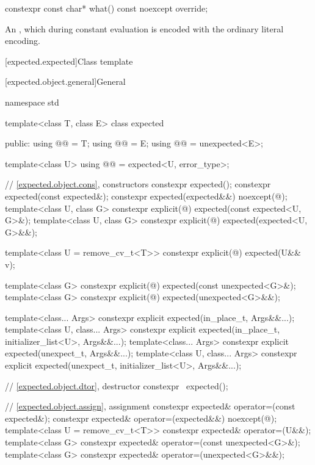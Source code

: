 %
\begin{itemdecl}
constexpr const char* what() const noexcept override;
\end{itemdecl}

\begin{itemdescr}
\pnum
\returns
An  \ntbs,
which during constant evaluation is encoded with
the ordinary literal encoding.
\end{itemdescr}

[expected.expected]{Class template }

[expected.object.general]{General}

\begin{codeblock}
namespace std {
  template<class T, class E>
  class expected {
  public:
    using @@ = T;
    using @@ = E;
    using @@ = unexpected<E>;

    template<class U>
    using @@ = expected<U, error_type>;

    // \ref{expected.object.cons}, constructors
    constexpr expected();
    constexpr expected(const expected&);
    constexpr expected(expected&&) noexcept(@\seebelow@);
    template<class U, class G>
      constexpr explicit(@\seebelow@) expected(const expected<U, G>&);
    template<class U, class G>
      constexpr explicit(@\seebelow@) expected(expected<U, G>&&);

    template<class U = remove_cv_t<T>>
      constexpr explicit(@\seebelow@) expected(U&& v);

    template<class G>
      constexpr explicit(@\seebelow@) expected(const unexpected<G>&);
    template<class G>
      constexpr explicit(@\seebelow@) expected(unexpected<G>&&);

    template<class... Args>
      constexpr explicit expected(in_place_t, Args&&...);
    template<class U, class... Args>
      constexpr explicit expected(in_place_t, initializer_list<U>, Args&&...);
    template<class... Args>
      constexpr explicit expected(unexpect_t, Args&&...);
    template<class U, class... Args>
      constexpr explicit expected(unexpect_t, initializer_list<U>, Args&&...);

    // \ref{expected.object.dtor}, destructor
    constexpr ~expected();

    // \ref{expected.object.assign}, assignment
    constexpr expected& operator=(const expected&);
    constexpr expected& operator=(expected&&) noexcept(@\seebelow@);
    template<class U = remove_cv_t<T>> constexpr expected& operator=(U&&);
    template<class G>
      constexpr expected& operator=(const unexpected<G>&);
    template<class G>
      constexpr expected& operator=(unexpected<G>&&);

}}
\end{codeblock}
